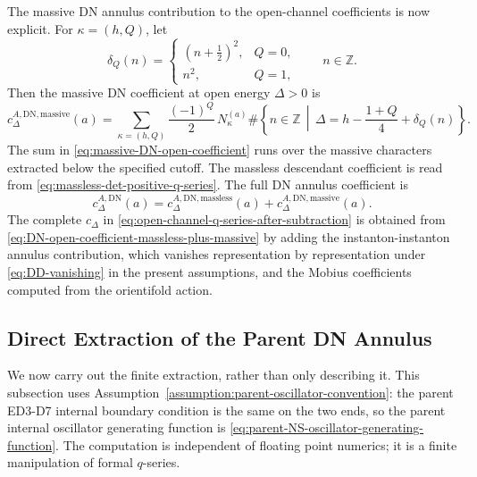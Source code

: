 \documentclass[11pt]{article}
\newcommand{\Z}{\mathbb{Z}}
\newcommand{\DN}{\mathrm{DN}}
\begin{document}
The massive DN annulus contribution to the open-channel coefficients is now explicit. For
\(\kappa=(h,Q)\), let
\begin{equation}
  \delta_Q(n)
  =
  \begin{cases}
    \left(n+\frac12\right)^2, & Q=0,\\[3pt]
    n^2, & Q=1,
  \end{cases}
  \qquad n\in\Z .
  \label{eq:theta-exponent-deltaQ}
\end{equation}
Then the massive DN coefficient at open energy \(\Delta>0\) is
\begin{equation}
  c_{\Delta}^{A,\DN,\mathrm{massive}}(a)
  =
  \sum_{\kappa=(h,Q)}
  \frac{(-1)^Q}{2}\,
  N_{\kappa}^{(a)}
  \#\left\{
    n\in\Z\,\middle|\,
    \Delta=h-\frac{1+Q}{4}+\delta_Q(n)
  \right\}.
  \label{eq:massive-DN-open-coefficient}
\end{equation}
The sum in \eqref{eq:massive-DN-open-coefficient} runs over the massive characters extracted
below the specified cutoff. The massless descendant coefficient is read from
\eqref{eq:massless-det-positive-q-series}. The full DN annulus coefficient is
\begin{equation}
  c_{\Delta}^{A,\DN}(a)
  =
  c_{\Delta}^{A,\DN,\mathrm{massless}}(a)
  +
  c_{\Delta}^{A,\DN,\mathrm{massive}}(a).
  \label{eq:DN-open-coefficient-massless-plus-massive}
\end{equation}
The complete \(c_\Delta\) in \eqref{eq:open-channel-q-series-after-subtraction} is obtained
from \eqref{eq:DN-open-coefficient-massless-plus-massive} by adding the instanton-instanton
annulus contribution, which vanishes representation by representation under
\eqref{eq:DD-vanishing} in the present assumptions, and the Mobius coefficients computed from
the orientifold action.

\subsection{Direct Extraction of the Parent DN Annulus}

We now carry out the finite extraction, rather than only describing it. This subsection uses
Assumption~\ref{assumption:parent-oscillator-convention}: the parent ED3-D7 internal boundary
condition is the same on the two ends, so the parent internal oscillator generating function is
\eqref{eq:parent-NS-oscillator-generating-function}. The computation is independent of floating
point numerics; it is a finite manipulation of formal \(q\)-series.
\end{document}
